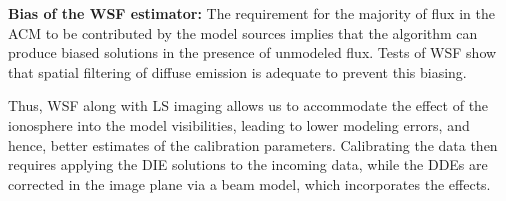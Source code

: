 \documentclass{aa}
\begin{document}
\begin{table}[tbh]
\caption{Flux ratios of bright sources within snapshot from Obs. 3.}
\label{tab:Flux-ratios-of-1}
\end{table}


\textbf{Bias of the WSF estimator:} The  requirement for the majority of flux in
the ACM  to be contributed by the  model sources implies that  the algorithm can
produce biased solutions  in the presence of unmodeled flux.   Tests of WSF show
that spatial filtering of diffuse emission is adequate to prevent this biasing.

Thus,  WSF along with  LS imaging  allows us  to accommodate  the effect  of the
ionosphere into  the model visibilities,  leading to lower modeling  errors, and
hence, better estimates of the calibration parameters.  Calibrating the data then
requires applying  the DIE solutions  to the incoming  data, while the  DDEs are
corrected in the image plane via a beam model, which incorporates the effects.
\end{document}
